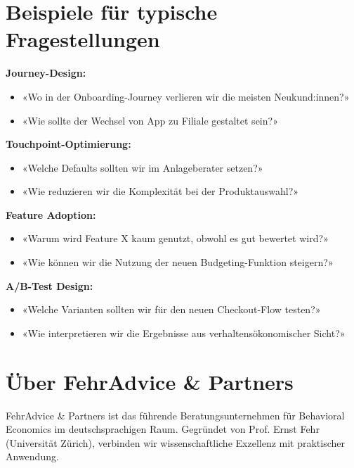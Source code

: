 \documentclass{fehradvice-report}
\begin{document}
\section{Beispiele für typische Fragestellungen}

\textbf{Journey-Design:}
\begin{itemize}
    \item «Wo in der Onboarding-Journey verlieren wir die meisten Neukund:innen?»
    \item «Wie sollte der Wechsel von App zu Filiale gestaltet sein?»
\end{itemize}

\textbf{Touchpoint-Optimierung:}
\begin{itemize}
    \item «Welche Defaults sollten wir im Anlageberater setzen?»
    \item «Wie reduzieren wir die Komplexität bei der Produktauswahl?»
\end{itemize}

\textbf{Feature Adoption:}
\begin{itemize}
    \item «Warum wird Feature X kaum genutzt, obwohl es gut bewertet wird?»
    \item «Wie können wir die Nutzung der neuen Budgeting-Funktion steigern?»
\end{itemize}

\textbf{A/B-Test Design:}
\begin{itemize}
    \item «Welche Varianten sollten wir für den neuen Checkout-Flow testen?»
    \item «Wie interpretieren wir die Ergebnisse aus verhaltensökonomischer Sicht?»
\end{itemize}

\section{Über FehrAdvice \& Partners}

FehrAdvice \& Partners ist das führende Beratungsunternehmen für Behavioral Economics im deutschsprachigen Raum. Gegründet von Prof. Ernst Fehr (Universität Zürich), verbinden wir wissenschaftliche Exzellenz mit praktischer Anwendung.
\end{document}
